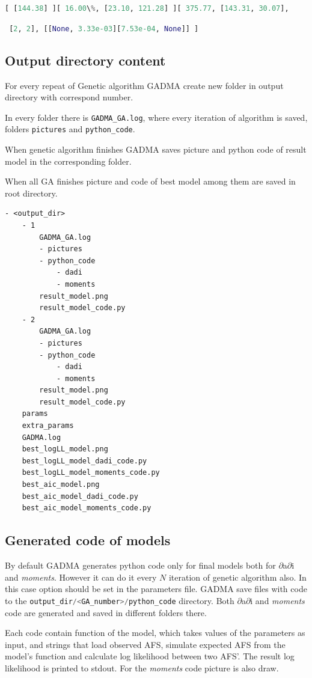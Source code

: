 \documentclass[12pt]{article}
\makeatletter
\newcommand{\dadi}{$\partial$a$\partial$i\xspace}
\newcommand{\moments}{\textit{moments}\xspace}
\newcommand{\py}[1]{\lstinline[language=Python, showstringspaces=False]@#1@}
\makeatother
\begin{document}
\py{[ [144.38] ][ 16.00\%, [23.10, 121.28] ][ 375.77, [143.31, 30.07],}

\hspace{6cm} \py{ [2, 2], [[None, 3.33e-03][7.53e-04, None]] ]}


\subsection{Output directory content}

For every repeat of Genetic algorithm GADMA create new folder in output directory with correspond number.

In every folder there is \py{GADMA_GA.log}, where every iteration of algorithm is saved, folders \py{pictures} and \py{python_code}.

When genetic algorithm finishes GADMA saves picture and python code of result model in the corresponding folder.

When all GA finishes picture and code of best model among them are saved in root directory.
\begin{lstlisting}
- <output_dir>
	- 1
		GADMA_GA.log
		- pictures
		- python_code
			- dadi
			- moments
		result_model.png
		result_model_code.py
	- 2
		GADMA_GA.log
		- pictures
		- python_code
			- dadi
			- moments
		result_model.png
		result_model_code.py
	params
	extra_params
	GADMA.log
	best_logLL_model.png
	best_logLL_model_dadi_code.py
	best_logLL_model_moments_code.py
	best_aic_model.png
	best_aic_model_dadi_code.py
	best_aic_model_moments_code.py
\end{lstlisting}

\subsection{Generated code of models}


By default GADMA generates python code only for final models both for \dadi and \moments. However it can do it every $N$ iteration of genetic algorithm also. In this case option \py{} should be set in the parameters file. GADMA save files with code to the \py{output_dir/<GA_number>/python_code} directory. Both \dadi and \moments code are generated and saved in different folders there. 

Each code contain function of the model, which takes values of the parameters as input, and strings that load observed AFS, simulate expected AFS from the model's function and calculate log likelihood between two AFS'. The result log likelihood is printed to stdout. For the \moments code picture is also draw.
\end{document}
